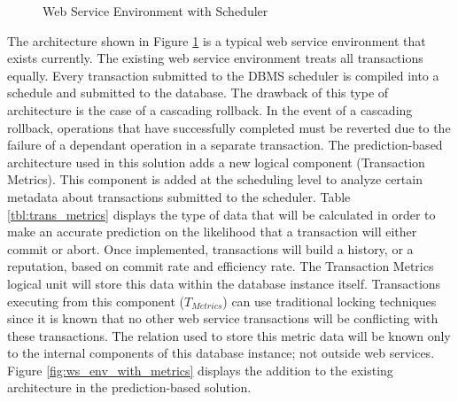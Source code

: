 \documentclass[conference]{IEEEtran}
\begin{document}
\begin{figure}[h]
\captionsetup{justification=centering}
\centering %


\caption{Web Service Environment with Scheduler} %
\label{fig:ws_env} %

\end{figure}

The architecture shown in Figure \ref{fig:ws_env} is a typical web service environment that exists currently. The existing web service environment treats all transactions equally. Every transaction submitted to the DBMS scheduler is compiled into a schedule and submitted to the database. The drawback of this type of architecture is the case of a cascading rollback. In the event of a cascading rollback, operations that have successfully completed must be reverted due to the failure of a dependant operation in a separate transaction. The prediction-based architecture used in this solution adds a new logical component (Transaction Metrics). This component is added at the scheduling level to analyze certain metadata about transactions submitted to the scheduler. Table \ref{tbl:trans_metrics} displays the type of data that will be calculated in order to make an accurate prediction on the likelihood that a transaction will either commit or abort. Once implemented, transactions will build a history, or a reputation, based on commit rate and efficiency rate. The Transaction Metrics logical unit will store this data within the database instance itself. Transactions executing from this component ($T_{Metrics}$) can use traditional locking techniques since it is known that no other web service transactions will be conflicting with these transactions. The relation used to store this metric data will be known only to the internal components of this database instance; not outside web services. Figure \ref{fig:ws_env_with_metrics} displays the addition to the existing architecture in the prediction-based solution.
\end{document}
